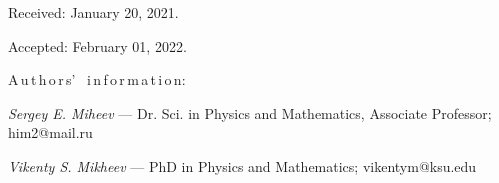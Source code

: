{\vskip 1.5mm

%


Received:  January 20, 2021.

Accepted: February 01, 2022.

\vskip 4.5mm%


A\,u\,t\,h\,o\,r\,s' \ i\,n\,f\,o\,r\,m\,a\,t\,i\,o\,n:


\vskip 2mm
 \textit{Sergey E. Miheev} --- Dr. Sci. in Physics and Mathematics, Associate Professor; him2@mail.ru \par


\vskip 2mm
 \textit{Vikenty S. Mikheev} --- PhD in Physics and Mathematics;
vikentym@ksu.edu \par
%
%
}
